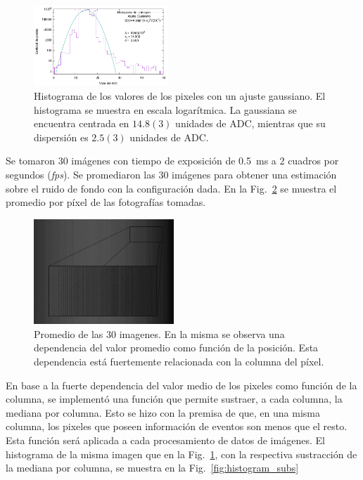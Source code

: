 \documentclass[twoside,twocolumn]{article}
\begin{document}
      \begin{figure}[h]
        \includegraphics[width=0.45\textwidth]{figures/background_histo.pdf}
        \caption{Histograma de los valores de los pixeles con un ajuste gaussiano.
          El histograma se muestra en escala logarítmica.
          La gaussiana se encuentra centrada en $14.8(3)$ unidades de ADC,
          mientras que su dispersión es $2.5(3)$ unidades de ADC.}
        \label{fig:histogram}
      \end{figure}
      
      Se tomaron 30 imágenes con tiempo de exposición de \SI{0.5}{\milli\second} a 2 cuadros por segundos (\emph{fps}).
      Se promediaron las 30 imágenes para obtener una estimación sobre el ruido de fondo con la configuración dada. 
      En la Fig.~\ref{fig:background} se muestra el promedio por píxel de las fotografías tomadas.

      \begin{figure}[h]
        \includegraphics[width=0.47\textwidth]{figures/background.jpg}
        \caption{Promedio de las 30 imagenes.
          En la misma se observa una dependencia del valor promedio como función de la posición.
          Esta dependencia está fuertemente relacionada con la columna del píxel. }
        \label{fig:background}
      \end{figure}
    
      En base a la fuerte dependencia del valor medio de los pixeles como función de la columna,
      se implementó una función que permite sustraer, a cada columna, la mediana por columna.
      Esto se hizo con la premisa de que, en una misma columna,
      los pixeles que poseen información de eventos son menos que el resto.
      Esta función será aplicada a cada procesamiento de datos de imágenes.
      El histograma de la misma imagen que en la Fig.~\ref{fig:histogram}, con la respectiva sustracción
      de la mediana por columna, se muestra en la Fig.~\ref{fig:histogram_subs}
\end{document}

